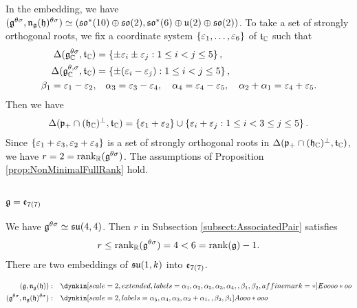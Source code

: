 In the embedding, we have $(\mathfrak{g}^{\theta\sigma}, \mathfrak{n}_{\mathfrak{g}}(\mathfrak{h})^{\theta\sigma}) \simeq (\mathfrak{so}^*(10) \oplus \mathfrak{so}(2), \mathfrak{so}^*(6)\oplus \mathfrak{u}(2) \oplus \mathfrak{so}(2))$.
To take a set of strongly orthogonal roots, we fix a coordinate system $\left\{\varepsilon_1, \ldots, \varepsilon_6 \right\}$ of $\mathfrak{t}_{\mathbb{C}}$ such that
\begin{align*}
	\Delta(\mathfrak{g}_{\mathbb{C}}^{\theta\sigma}, \mathfrak{t}_{\mathbb{C}}) &= \left\{\pm \varepsilon_i \pm \varepsilon_j: 1\leq i < j \leq 5 \right\}, \\
	\Delta(\mathfrak{g}_{\mathbb{C}}^{\theta, \sigma}, \mathfrak{t}_{\mathbb{C}}) &= \left\{\pm (\varepsilon_i - \varepsilon_j): 1\leq i < j \leq 5 \right\}, \\
	\beta_1 = \varepsilon_1 - \varepsilon_2, &\quad \alpha_3 = \varepsilon_3 - \varepsilon_4, \quad \alpha_4 = \varepsilon_4 - \varepsilon_5, \quad \alpha_2 + \alpha_1 = \varepsilon_4 + \varepsilon_5.
\end{align*}
Then we have
\begin{align*}
	\Delta(\mathfrak{p}_+ \cap (\mathfrak{h}_{\mathbb{C}})^\perp, \mathfrak{t}_{\mathbb{C}}) = \left\{\varepsilon_1 + \varepsilon_2 \right\} \cup \left\{\varepsilon_i + \varepsilon_j: 1 \leq i < 3 \leq j \leq 5 \right\}.
\end{align*}
Since $\left\{\varepsilon_1 + \varepsilon_3, \varepsilon_2 + \varepsilon_4 \right\}$ is a set of strongly orthogonal roots in $\Delta(\mathfrak{p}_+ \cap (\mathfrak{h}_{\mathbb{C}})^\perp, \mathfrak{t}_{\mathbb{C}})$, we have $r = 2 = \operatorname{rank}_{\mathbb{R}}(\mathfrak{g}^{\theta\sigma})$.
The assumptions of Proposition \ref{prop:NonMinimalFullRank} hold.

\subsubsection{\texorpdfstring{$\mathfrak{g} = \mathfrak{e}_{7(7)}$}{g=e7(7)}}


We have $\mathfrak{g}^{\theta\sigma} \simeq \mathfrak{su}(4, 4)$.
Then $r$ in Subsection \ref{subsect:AssociatedPair} satisfies
\begin{align*}
	r \leq \operatorname{rank}_{\mathbb{R}}(\mathfrak{g}^{\theta\sigma}) = 4 < 6 = \operatorname{rank}(\mathfrak{g}) - 1.
\end{align*}
There are two embeddings of $\mathfrak{su}(1, k)$ into $\mathfrak{e}_{7(7)}$.

\begin{align*}
	(\lie{g}, \lieNorm_{\lie{g}}(\lie{h})): \quad & \dynkin[scale=2, extended, labels={\alpha_1, \alpha_2, \alpha_5, \alpha_3, \alpha_4, , \beta_1, \beta_2}, affine mark=*]{E}{oooo*oo} \\
	(\lie{g}^{\theta\sigma}, \lieNorm_{\lie{g}}(\lie{h})^{\theta\sigma}): \quad & \dynkin[scale=2, labels={\alpha_5, \alpha_4, \alpha_3, \alpha_2 + \alpha_1, , \beta_2, \beta_1}]{A}{ooo*ooo}
\end{align*}

